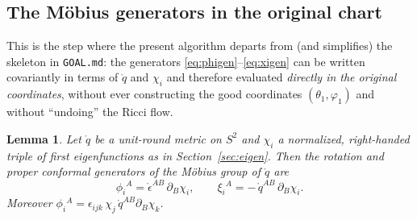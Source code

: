 \documentclass[11pt]{article}
\newtheorem{lemma}{Lemma}
\newcommand{\qo}{\mathring{q}}          %
\newcommand{\epso}{\mathring{\epsilon}} %
\begin{document}
\subsection{The M\"obius generators in the original chart}
\label{sec:generators}

This is the step where the present algorithm departs from (and simplifies)
the skeleton in \texttt{GOAL.md}: the generators
\eqref{eq:phigen}--\eqref{eq:xigen} can be written covariantly in terms of
$\qo$ and $\chi_i$ and therefore evaluated \emph{directly in the original
coordinates}, without ever constructing the good coordinates
$(\theta_1,\varphi_1)$ and without ``undoing'' the Ricci flow.

\begin{lemma}\label{lem:generators}
Let $\qo$ be a unit-round metric on $S^2$ and $\chi_i$ a normalized,
right-handed triple of first eigenfunctions as in
Section~\ref{sec:eigen}.  Then the rotation and proper conformal generators
of the M\"obius group of $\qo$ are
\begin{equation}
  \boxed{\;
  \phi_i{}^A = \epso^{AB}\,\partial_B \chi_i,
  \qquad
  \xi_i{}^A = -\,\qo^{AB}\,\partial_B \chi_i .
  \;}
  \label{eq:generatorscov}
\end{equation}
Moreover $\phi_i{}^A = \epsilon_{ijk}\,\chi_j\,\qo^{AB}\partial_B\chi_k$.
\end{lemma}
\end{document}
